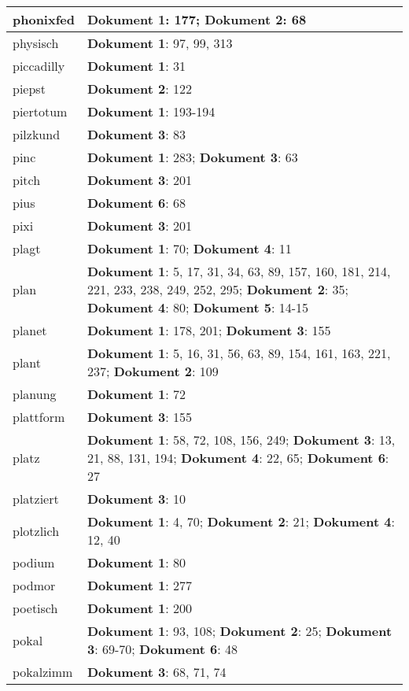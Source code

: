 \documentclass[a5paper]{article}
\begin{document}
\begin{longtable}[l]{|l|p{3in}|}
\hline
phonixfed & \textbf{Dokument 1}: 177; \textbf{Dokument 2}: 68 \\
\hline
physisch & \textbf{Dokument 1}: 97, 99, 313 \\
\hline
piccadilly & \textbf{Dokument 1}: 31 \\
\hline
piepst & \textbf{Dokument 2}: 122 \\
\hline
piertotum & \textbf{Dokument 1}: 193-194 \\
\hline
pilzkund & \textbf{Dokument 3}: 83 \\
\hline
pinc & \textbf{Dokument 1}: 283; \textbf{Dokument 3}: 63 \\
\hline
pitch & \textbf{Dokument 3}: 201 \\
\hline
pius & \textbf{Dokument 6}: 68 \\
\hline
pixi & \textbf{Dokument 3}: 201 \\
\hline
plagt & \textbf{Dokument 1}: 70; \textbf{Dokument 4}: 11 \\
\hline
plan & \textbf{Dokument 1}: 5, 17, 31, 34, 63, 89, 157, 160, 181, 214, 221, 233, 238, 249, 252, 295; \textbf{Dokument 2}: 35; \textbf{Dokument 4}: 80; \textbf{Dokument 5}: 14-15 \\
\hline
planet & \textbf{Dokument 1}: 178, 201; \textbf{Dokument 3}: 155 \\
\hline
plant & \textbf{Dokument 1}: 5, 16, 31, 56, 63, 89, 154, 161, 163, 221, 237; \textbf{Dokument 2}: 109 \\
\hline
planung & \textbf{Dokument 1}: 72 \\
\hline
plattform & \textbf{Dokument 3}: 155 \\
\hline
platz & \textbf{Dokument 1}: 58, 72, 108, 156, 249; \textbf{Dokument 3}: 13, 21, 88, 131, 194; \textbf{Dokument 4}: 22, 65; \textbf{Dokument 6}: 27 \\
\hline
platziert & \textbf{Dokument 3}: 10 \\
\hline
plotzlich & \textbf{Dokument 1}: 4, 70; \textbf{Dokument 2}: 21; \textbf{Dokument 4}: 12, 40 \\
\hline
podium & \textbf{Dokument 1}: 80 \\
\hline
podmor & \textbf{Dokument 1}: 277 \\
\hline
poetisch & \textbf{Dokument 1}: 200 \\
\hline
pokal & \textbf{Dokument 1}: 93, 108; \textbf{Dokument 2}: 25; \textbf{Dokument 3}: 69-70; \textbf{Dokument 6}: 48 \\
\hline
pokalzimm & \textbf{Dokument 3}: 68, 71, 74 \\

\end{longtable}
\end{document}
